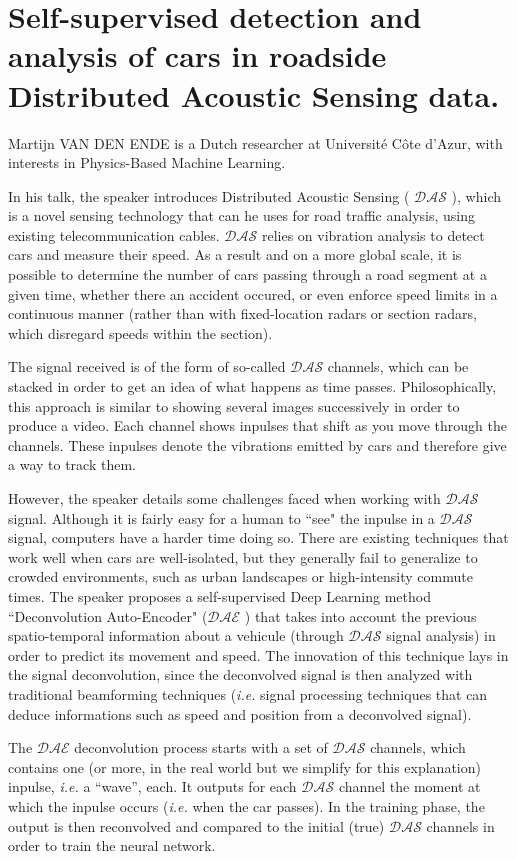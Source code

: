 \documentclass[oneside, 10pt]{article}
\newcommand{\ie}{\textit{i.e. }}
\newcommand{\das}{\ensuremath{\mathcal{DAS}} }
\newcommand{\dae}{\ensuremath{\mathcal{DAE}} }
\begin{document}
\newpage

\section{Self-supervised detection and analysis of cars in roadside Distributed Acoustic Sensing data.} Martijn VAN DEN ENDE is a Dutch researcher at Université Côte d'Azur, with interests in Physics-Based Machine Learning.

In  his talk, the speaker introduces Distributed Acoustic Sensing ( \das), which is a novel sensing technology that can he uses for road traffic analysis, using existing telecommunication cables. \das relies on vibration analysis to detect cars and measure their speed. As a result and on a more global scale, it is possible to determine the number of cars passing through a road segment at a given time, whether there an accident occured, or even enforce speed limits in a continuous manner (rather than with fixed-location radars or section radars, which disregard speeds within the section).

The signal received is of the form of so-called \das channels, which can be stacked in order to get an idea of what happens as time passes. Philosophically, this approach is similar to showing several images successively in order to produce a video. Each channel shows inpulses that shift as you move through the channels. These inpulses denote the vibrations emitted by cars and therefore give a way to track them.

However, the speaker details some challenges faced when working with \das signal. Although it is fairly easy for a human to ``see" the inpulse in a \das signal, computers have a harder time doing so. There are existing techniques that work well when cars are well-isolated, but they generally fail to generalize to crowded environments, such as urban landscapes or high-intensity commute times. The speaker proposes a self-supervised Deep Learning method ``Deconvolution Auto-Encoder" (\dae) that takes into account the previous spatio-temporal information about a vehicule (through \das signal analysis) in order to predict its movement and speed. The innovation of this technique lays in the signal deconvolution, since the deconvolved signal is then analyzed with traditional beamforming techniques (\ie signal processing techniques that can deduce informations such as speed and position from a deconvolved signal).

The \dae deconvolution process starts with a set of \das channels, which contains one (or more, in the real world but we simplify for this explanation) inpulse, \ie a ``wave'', each. It outputs for each \das channel the moment at which the inpulse occurs (\ie when the car passes). In the training phase, the output is then reconvolved and compared to the initial (true) \das channels in order to train the neural network. 
\end{document}
